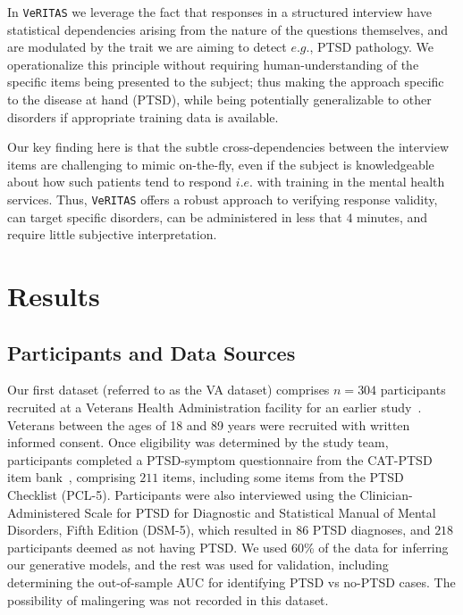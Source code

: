 \documentclass[onecolumn,10pt]{IEEEtran}
\def\vrts{\texttt{VeRITAS}\xspace}
\begin{document}
In  \vrts we leverage the fact that
responses  in a structured interview have  statistical dependencies  arising from the nature of the questions themselves, and are modulated by the trait we are aiming to detect $e.g.$, PTSD pathology. We operationalize this principle without requiring human-understanding of the specific items being presented to the subject; thus making the approach   specific to the disease at hand (PTSD), while being  potentially generalizable to other disorders if appropriate training data is available.

Our key finding here is that the subtle cross-dependencies between the interview items   are challenging to  mimic on-the-fly, even if the subject is  knowledgeable about how such patients tend to respond $i.e.$ with training in the mental health services.   Thus,  \vrts offers a robust  approach to verifying response validity, can target specific disorders,  can be administered in less that $4$ minutes, and require little subjective interpretation.

\def\Mpos{M^+}
\def\Mcont{M^0}

\section*{Results} 




\subsection*{Participants and Data Sources}
Our  first   dataset  (referred to as the VA dataset)  comprises  $n=304$ participants  recruited at a Veterans Health Administration facility for an earlier study~\cite{brenner2021development}. Veterans  between the ages of 18 and 89 years were recruited with written informed consent. Once eligibility was determined by the study team, participants completed a PTSD-symptom questionnaire from the CAT-PTSD item bank~\cite{gibbons2012development,brenner2021development}, comprising $211$ items, including some items from the  PTSD Checklist (PCL-5). Participants  were also interviewed using the Clinician-Administered Scale for PTSD for Diagnostic and Statistical Manual of Mental Disorders, Fifth Edition (DSM-5), which resulted in $86$ PTSD  diagnoses, and $218$ participants  deemed as  not having PTSD. We used {\color{Red1} 60\%} of the data for inferring our generative models, and the rest was used for validation, including determining the out-of-sample AUC for identifying PTSD vs no-PTSD cases. The possibility of malingering was not recorded in this dataset.
\end{document}
